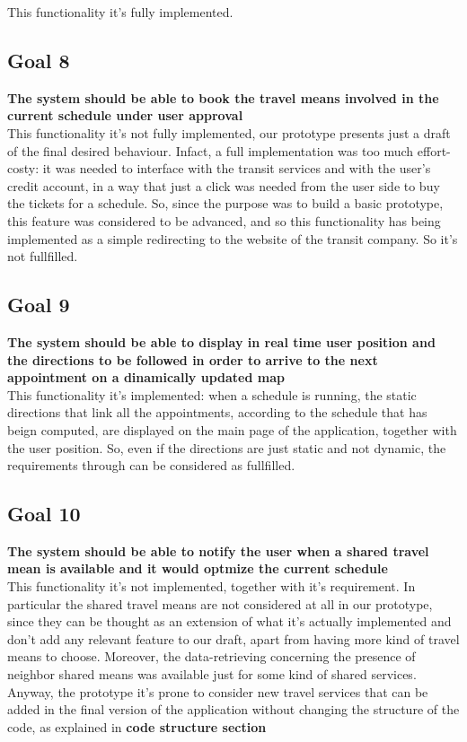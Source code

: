 This functionality it's fully implemented.

\subsection{Goal 8} \label{subsect:gScheduleSelection}
\textbf{The system should be able to book the travel means involved in the current schedule under user approval}\\

This functionality it's not fully implemented, our prototype presents just a draft of the final desired behaviour. Infact, a full implementation was too much effort-costy: it was needed to interface with the transit services and with the user's credit account, in a way that just a click was needed from the user side to buy the tickets for a schedule. So, since the purpose was to build a basic prototype, this feature was considered to be advanced, and so this functionality has being implemented as a simple redirecting to the website of the transit company. So  it's not fullfilled.

\subsection{Goal 9} \label{subsect:gDirections}
\textbf{The system should be able to display in real time user position and the directions to be followed in order to arrive to the next appointment on a dinamically updated map}\\

This functionality it's implemented: when a schedule is running, the static directions that link all the appointments, according to the schedule that has beign computed, are displayed on the main page of the application, together with the user position. So, even if the directions are just static and not dynamic, the requirements  through  can be considered as fullfilled.

\subsection{Goal 10} \label{subsect:gSharedTMNotifications}
\textbf{The system should be able to notify the user when a shared travel mean is available and it would optmize the current schedule}\\

This functionality it's not implemented, together with it's requirement. In particular the shared travel means are not considered at all in our prototype, since they can be thought as an extension of what it's actually implemented and don't add any relevant feature to our draft, apart from having more kind of travel means to choose. Moreover, the data-retrieving concerning the presence of neighbor shared means was available just for some kind of shared services. 
Anyway, the prototype it's prone to consider new travel services that can be added in the final version of the application without changing the structure of the code, as explained in \textbf{code structure section}
